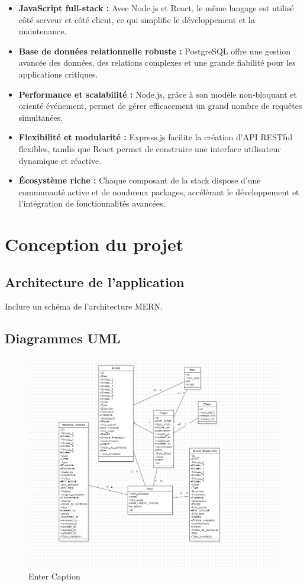\documentclass[12pt,a4paper]{report}
\begin{document}
\begin{itemize}
    \item \textbf{JavaScript full-stack :} Avec Node.js et React, le même langage est utilisé côté serveur et côté client, ce qui simplifie le développement et la maintenance.
    \item \textbf{Base de données relationnelle robuste :} PostgreSQL offre une gestion avancée des données, des relations complexes et une grande fiabilité pour les applications critiques.
    \item \textbf{Performance et scalabilité :} Node.js, grâce à son modèle non-bloquant et orienté événement, permet de gérer efficacement un grand nombre de requêtes simultanées.
    \item \textbf{Flexibilité et modularité :} Express.js facilite la création d’API RESTful flexibles, tandis que React permet de construire une interface utilisateur dynamique et réactive.
    \item \textbf{Écosystème riche :} Chaque composant de la stack dispose d’une communauté active et de nombreux packages, accélérant le développement et l’intégration de fonctionnalités avancées.
\end{itemize}

\chapter{Conception du projet}
\section{Architecture de l’application}
Inclure un schéma de l’architecture MERN.  

\section{Diagrammes UML}

\begin{figure}[H]
    \centering
    \includegraphics[width=0.5\linewidth]{image.png}
    \caption{Enter Caption}
    \label{fig:placeholder}
\end{figure}
\end{document}
